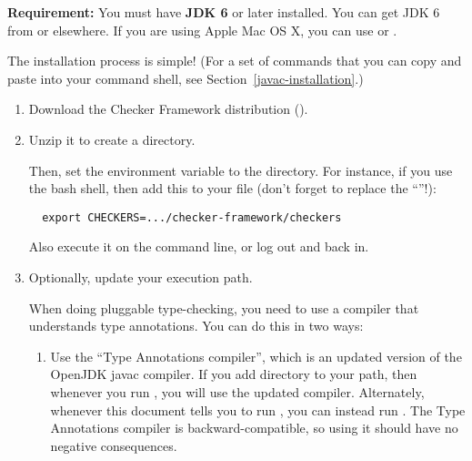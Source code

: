 \textbf{Requirement:}
You must have \textbf{JDK 6} or later installed.  You can get JDK 6 from
or elsewhere.  If you are using Apple Mac OS X, you can use
 or
.

The installation process is simple!  (For a set of commands that you can
copy and paste into your command shell, see
Section~\ref{javac-installation}.)
\begin{enumerate}
\item
  Download the Checker Framework distribution
  ().
\item 
  Unzip it to create a  directory.

  Then, set the
   environment variable to the
   directory.  For instance, if you use
  the bash shell, then add this to your  file (don't forget
  to replace the ``''!):
\begin{Verbatim}
  export CHECKERS=.../checker-framework/checkers
\end{Verbatim}
  Also execute it on the command line, or log out and back in.

\item
  Optionally, update your execution path.

  When doing pluggable type-checking, you need to use a compiler that
  understands type annotations.  You can do this in two ways:

\begin{enumerate}
\item
  Use the ``Type Annotations compiler'', which is an updated version of the
  OpenJDK javac compiler.  If you add directory
   to your path, then whenever
  you run , you will use the updated compiler.
  Alternately, whenever this document tells you to run , you
  can instead run .
  The Type Annotations compiler is
  backward-compatible, so using it should have no negative consequences.



\end{enumerate}
\end{enumerate}
